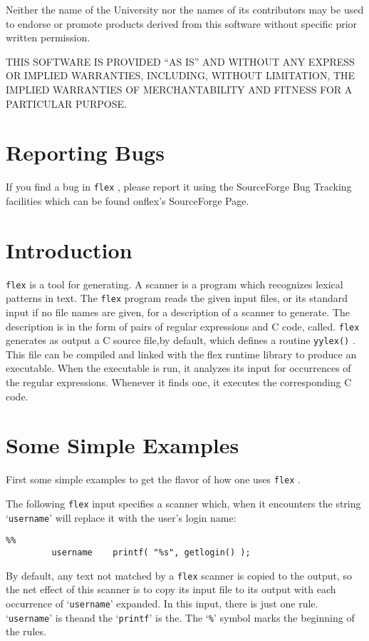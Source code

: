 \documentclass[openany,oneside]{book}
\begin{document}
Neither the name of the University nor the names of its contributors
may be used to endorse or promote products derived from this software
without specific prior written permission.

THIS SOFTWARE IS PROVIDED “AS IS” AND WITHOUT ANY EXPRESS OR
IMPLIED WARRANTIES, INCLUDING, WITHOUT LIMITATION, THE IMPLIED
WARRANTIES OF MERCHANTABILITY AND FITNESS FOR A PARTICULAR
PURPOSE.
\chapter{Reporting Bugs}

\mainmatter

If you find a bug in \verb`flex` , please report it using
the SourceForge Bug Tracking facilities which can be found onflex's SourceForge Page.
\chapter{Introduction}


 \verb`flex` is a tool for generating.  A scanner is a
program which recognizes lexical patterns in text.  The \verb`flex` program reads the given input files, or its standard input if no file
names are given, for a description of a scanner to generate.  The
description is in the form of pairs of regular expressions and C code,
called. \verb`flex` generates as output a C source file,by default, which defines a routine \verb`yylex()` . 
This file can be compiled and linked with the flex runtime library to
produce an executable.  When the executable is run, it analyzes its
input for occurrences of the regular expressions.  Whenever it finds
one, it executes the corresponding C code.
\chapter{Some Simple Examples}


First some simple examples to get the flavor of how one uses \verb`flex` .

The following \verb`flex` input specifies a scanner which, when it
encounters the string ‘\verb`username`’ will replace it with the user's
login name:
\begin{verbatim}
%%
         username    printf( "%s", getlogin() );
\end{verbatim}


By default, any text not matched by a \verb`flex` scanner is copied to
the output, so the net effect of this scanner is to copy its input file
to its output with each occurrence of ‘\verb`username`’ expanded.  In this
input, there is just one rule.  ‘\verb`username`’ is theand
the ‘\verb`printf`’ is the.  The ‘\verb`%`’ symbol marks the
beginning of the rules.
\end{document}
